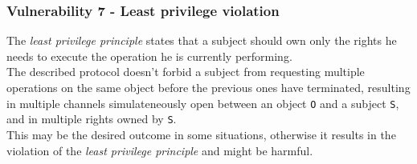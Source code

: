 \subsubsection{Vulnerability 7 - Least privilege violation}

The \textit{least privilege principle} states that a subject should own only the rights he needs to execute the operation he is currently performing.\\
The described protocol doesn't forbid a subject from requesting multiple operations on the same object before the previous ones have terminated,
resulting in multiple channels simulateneously open between an object \texttt{O} and a subject \texttt{S}, 
and in multiple rights owned by \texttt{S}.\\
This may be the desired outcome in some situations,
otherwise it results in the violation of the \textit{least privilege principle} and might be harmful.